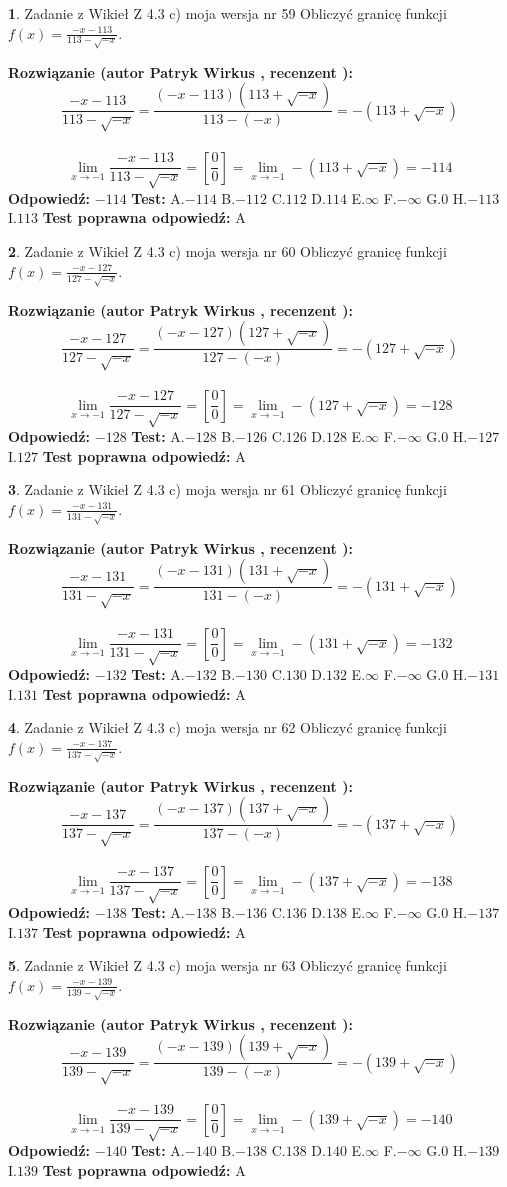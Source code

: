 \documentclass[12pt, a4paper]{article}
\theoremstyle{definition} %
\newtheorem{zad}{}
\newcommand{\zadStart}[1]{\begin{zad}#1\newline}
\newcommand{\zadStop}{\end{zad}}
\newcommand{\rozwStart}[2]{\noindent \textbf{Rozwiązanie (autor #1 , recenzent #2): }\newline}
\newcommand{\rozwStop}{\newline}
\newcommand{\odpStart}{\noindent \textbf{Odpowiedź:}\newline}
\newcommand{\odpStop}{\newline}
\newcommand{\testStart}{\noindent \textbf{Test:}\newline}
\newcommand{\testStop}{\newline}
\newcommand{\kluczStart}{\noindent \textbf{Test poprawna odpowiedź:}\newline}
\newcommand{\kluczStop}{\newline}
\begin{document}
\zadStart{Zadanie z Wikieł Z 4.3 c) moja wersja nr 59}
Obliczyć granicę funkcji $f(x)=\frac{-x-113}{113-\sqrt{-x}}$.
\zadStop
\rozwStart{Patryk Wirkus}{}
$$\frac{-x-113}{113-\sqrt{-x}}=\frac{(-x-113)(113+\sqrt{-x})}{113-(-x)}=-(113+\sqrt{-x})$$
\\
$$\lim\limits_{x\to-1}\frac{-x-113}{113-\sqrt{-x}}=[\frac{0}{0}]=\lim\limits_{x\to-1}-(113+\sqrt{-x}) =-114$$
\rozwStop
\odpStart
$-114$
\odpStop
\testStart
A.$-114$
B.$-112$
C.$112$
D.$114$
E.$\infty$
F.$-\infty$
G.$0$
H.$-113$
I.$113$
\testStop
\kluczStart
A
\kluczStop



\zadStart{Zadanie z Wikieł Z 4.3 c) moja wersja nr 60}
Obliczyć granicę funkcji $f(x)=\frac{-x-127}{127-\sqrt{-x}}$.
\zadStop
\rozwStart{Patryk Wirkus}{}
$$\frac{-x-127}{127-\sqrt{-x}}=\frac{(-x-127)(127+\sqrt{-x})}{127-(-x)}=-(127+\sqrt{-x})$$
\\
$$\lim\limits_{x\to-1}\frac{-x-127}{127-\sqrt{-x}}=[\frac{0}{0}]=\lim\limits_{x\to-1}-(127+\sqrt{-x}) =-128$$
\rozwStop
\odpStart
$-128$
\odpStop
\testStart
A.$-128$
B.$-126$
C.$126$
D.$128$
E.$\infty$
F.$-\infty$
G.$0$
H.$-127$
I.$127$
\testStop
\kluczStart
A
\kluczStop



\zadStart{Zadanie z Wikieł Z 4.3 c) moja wersja nr 61}
Obliczyć granicę funkcji $f(x)=\frac{-x-131}{131-\sqrt{-x}}$.
\zadStop
\rozwStart{Patryk Wirkus}{}
$$\frac{-x-131}{131-\sqrt{-x}}=\frac{(-x-131)(131+\sqrt{-x})}{131-(-x)}=-(131+\sqrt{-x})$$
\\
$$\lim\limits_{x\to-1}\frac{-x-131}{131-\sqrt{-x}}=[\frac{0}{0}]=\lim\limits_{x\to-1}-(131+\sqrt{-x}) =-132$$
\rozwStop
\odpStart
$-132$
\odpStop
\testStart
A.$-132$
B.$-130$
C.$130$
D.$132$
E.$\infty$
F.$-\infty$
G.$0$
H.$-131$
I.$131$
\testStop
\kluczStart
A
\kluczStop



\zadStart{Zadanie z Wikieł Z 4.3 c) moja wersja nr 62}
Obliczyć granicę funkcji $f(x)=\frac{-x-137}{137-\sqrt{-x}}$.
\zadStop
\rozwStart{Patryk Wirkus}{}
$$\frac{-x-137}{137-\sqrt{-x}}=\frac{(-x-137)(137+\sqrt{-x})}{137-(-x)}=-(137+\sqrt{-x})$$
\\
$$\lim\limits_{x\to-1}\frac{-x-137}{137-\sqrt{-x}}=[\frac{0}{0}]=\lim\limits_{x\to-1}-(137+\sqrt{-x}) =-138$$
\rozwStop
\odpStart
$-138$
\odpStop
\testStart
A.$-138$
B.$-136$
C.$136$
D.$138$
E.$\infty$
F.$-\infty$
G.$0$
H.$-137$
I.$137$
\testStop
\kluczStart
A
\kluczStop



\zadStart{Zadanie z Wikieł Z 4.3 c) moja wersja nr 63}
Obliczyć granicę funkcji $f(x)=\frac{-x-139}{139-\sqrt{-x}}$.
\zadStop
\rozwStart{Patryk Wirkus}{}
$$\frac{-x-139}{139-\sqrt{-x}}=\frac{(-x-139)(139+\sqrt{-x})}{139-(-x)}=-(139+\sqrt{-x})$$
\\
$$\lim\limits_{x\to-1}\frac{-x-139}{139-\sqrt{-x}}=[\frac{0}{0}]=\lim\limits_{x\to-1}-(139+\sqrt{-x}) =-140$$
\rozwStop
\odpStart
$-140$
\odpStop
\testStart
A.$-140$
B.$-138$
C.$138$
D.$140$
E.$\infty$
F.$-\infty$
G.$0$
H.$-139$
I.$139$
\testStop
\kluczStart
A
\kluczStop
\end{document}
